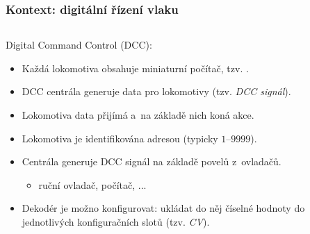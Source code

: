 \documentclass[aspectratio=169]{beamer}
\begin{document}

\begin{frame}
\frametitle{Kontext: digitální řízení vlaku}
\begin{columns}
	\begin{column}{.8\textwidth}
		Digital Command Control (DCC):
		\begin{itemize}
		\item Každá lokomotiva obsahuje miniaturní počítač, tzv. .
		\item DCC centrála generuje data pro lokomotivy (tzv. \textit{DCC signál}).
		\item Lokomotiva data přijímá a na základě nich koná akce.
		\item Lokomotiva je identifikována adresou (typicky $1$--$9999$).
		\item Centrála generuje DCC signál na základě povelů z~ovladačů.
		\begin{itemize}
		\item ruční ovladač, počítač, ...
		\end{itemize}
		\item Dekodér je možno konfigurovat: ukládat do něj číselné hodnoty do jednotlivých
		konfiguračních slotů (tzv. \textit{CV}).
		\end{itemize}
	\end{column}
	\begin{column}{.2\textwidth}

\end{column}
\end{columns}
\end{frame}
\end{document}
